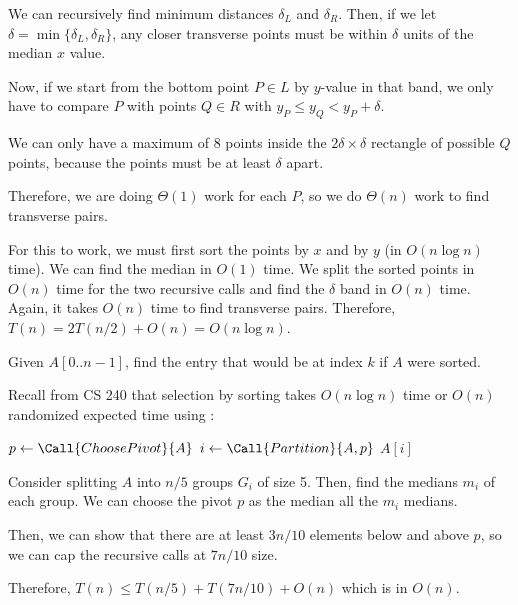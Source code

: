 We can recursively find minimum distances $\delta_L$ and $\delta_R$.
Then, if we let $\delta = \min\{\delta_L,\delta_R\}$,
any closer transverse points must be within $\delta$ units of the median $x$ value.

Now, if we start from the bottom point $P \in L$ by $y$-value in that band,
we only have to compare $P$ with points $Q \in R$ with $y_P \leq y_Q < y_P + \delta$.

We can only have a maximum of 8 points inside the $2\delta \times \delta$
rectangle of possible $Q$ points, because the points must be at least $\delta$ apart.

Therefore, we are doing $\Theta(1)$ work for each $P$, so we do $\Theta(n)$
work to find transverse pairs.

For this to work, we must first sort the points by $x$ and by $y$ (in $O(n\log n)$ time).
We can find the median in $O(1)$ time.
We split the sorted points in $O(n)$ time for the two recursive calls
and find the $\delta$ band in $O(n)$ time.
Again, it takes $O(n)$ time to find transverse pairs.
Therefore, $T(n) = 2T(n/2) + O(n) = O(n\log n)$.

\begin{problem}[selection]
  Given $A[0..n-1]$, find the entry that would be at index $k$ if $A$ were sorted.
\end{problem}

Recall from CS 240 that selection by sorting takes $O(n\log n)$ time
or $O(n)$ randomized expected time using :

\begin{algorithm}[H]
  \caption{}
  \begin{algorithmic}[1]
    \State $p \gets \Call{ChoosePivot}{A}$
    \State $i \gets \Call{Partition}{A, p}$ 
     \Return $A[i]$
     \Return {}
    \Else{} \Return {}
    \EndIf
  \end{algorithmic}
\end{algorithm}

Consider splitting $A$ into $n/5$ groups $G_i$ of size 5.
Then, find the medians $m_i$ of each group.
We can choose the pivot $p$ as the median all the $m_i$ medians.

Then, we can show that there are at least $3n/10$ elements below and above $p$,
so we can cap the recursive calls at $7n/10$ size.

Therefore, $T(n) \leq T(n/5) + T(7n/10) + O(n)$ which is in $O(n)$.
